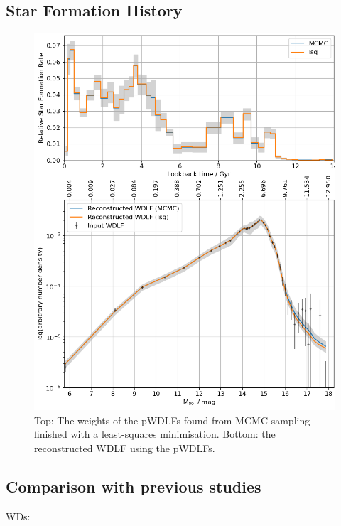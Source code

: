 \documentclass[fleqn,usenatbib]{mnras}
\begin{document}
\subsection{Star Formation History}

\begin{figure}
    \includegraphics[width=\textwidth]{figures/fig_06_gcns_reconstructed_wdlf_optimal_resolution_bin_optimal.png}
    \caption{Top: The weights of the pWDLFs found from MCMC sampling finished with a least-squares minimisation. Bottom: the reconstructed WDLF using the pWDLFs.}
    \label{fig:sfh_mag_bin_05}
\end{figure}



\subsection{Comparison with previous studies}

WDs:
\citep{2013MNRAS.434.1549R}
\citep{2014ApJ...791...92T}
\citep{2019ApJ...887..148F}
\end{document}
